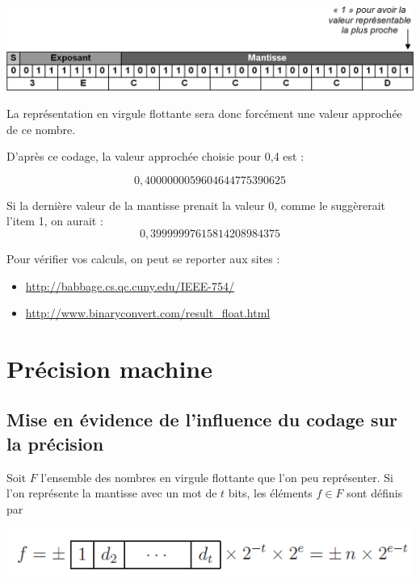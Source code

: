 \documentclass[10pt,fleqn]{article} %
\begin{document}
\begin{exemple}
\begin{center}
\includegraphics[width=.8\textwidth]{images/precision_2}
\end{center}

La représentation en virgule flottante sera donc forcément une valeur approchée de ce nombre.

D’après ce codage, la valeur approchée choisie pour 0,4 est : 

   $$ 0,4000000059604644775390625$$


Si la dernière valeur de la mantisse prenait la valeur 0, comme le suggèrerait l'item 1, on aurait :
$$
0,39999997615814208984375
$$

\end{exemple}

\begin{rem}
Pour vérifier vos calculs, on peut se reporter aux sites :
\begin{itemize}
\item \url{http://babbage.cs.qc.cuny.edu/IEEE-754/}
\item \url{http://www.binaryconvert.com/result_float.html}
\end{itemize}
\end{rem}

\section{Précision machine \cite{Manfred}}

\subsection{Mise en évidence de l'influence du codage sur la précision}

Soit $F$ l'ensemble des nombres en virgule flottante que l'on peu représenter.
Si l'on représente la mantisse avec un mot de $t$ bits, les éléments $f \in F$ sont définis par


\begin{center}
\includegraphics[width=.5\textwidth]{images/eps2.png}
\end{center}
\end{document}
